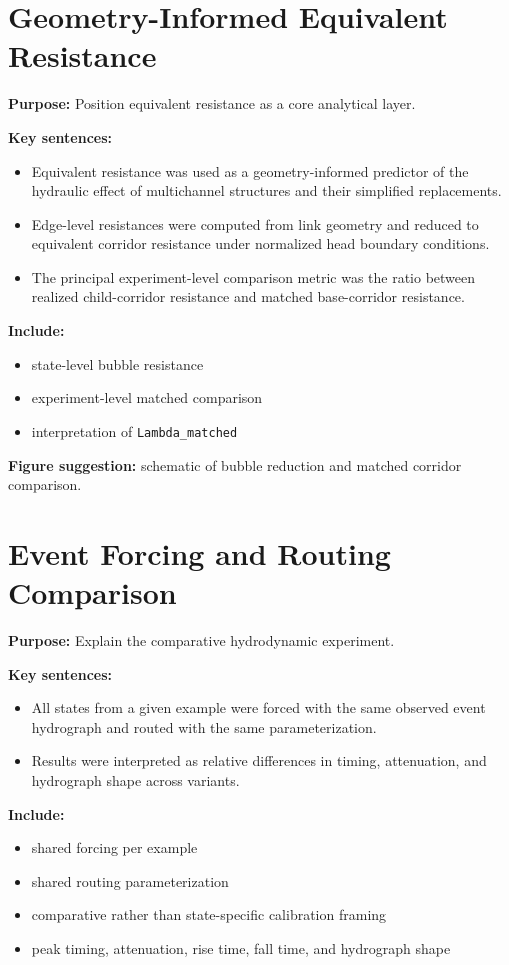 \documentclass[11pt]{article}
\begin{document}
\section{Geometry-Informed Equivalent Resistance}
\textbf{Purpose:} Position equivalent resistance as a core analytical layer.

\textbf{Key sentences:}
\begin{itemize}
\item Equivalent resistance was used as a geometry-informed predictor of the hydraulic effect of multichannel structures and their simplified replacements.
\item Edge-level resistances were computed from link geometry and reduced to equivalent corridor resistance under normalized head boundary conditions.
\item The principal experiment-level comparison metric was the ratio between realized child-corridor resistance and matched base-corridor resistance.
\end{itemize}

\textbf{Include:}
\begin{itemize}
\item state-level bubble resistance
\item experiment-level matched comparison
\item interpretation of \texttt{Lambda\_matched}
\end{itemize}

\textbf{Figure suggestion:} schematic of bubble reduction and matched corridor comparison.

\section{Event Forcing and Routing Comparison}
\textbf{Purpose:} Explain the comparative hydrodynamic experiment.

\textbf{Key sentences:}
\begin{itemize}
\item All states from a given example were forced with the same observed event hydrograph and routed with the same parameterization.
\item Results were interpreted as relative differences in timing, attenuation, and hydrograph shape across variants.
\end{itemize}

\textbf{Include:}
\begin{itemize}
\item shared forcing per example
\item shared routing parameterization
\item comparative rather than state-specific calibration framing
\item peak timing, attenuation, rise time, fall time, and hydrograph shape
\end{itemize}
\end{document}
